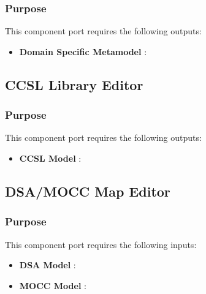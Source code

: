 \documentclass{gemoc} %
\begin{document}

\subsubsection{Purpose}


This component port requires the following outputs:
\begin{itemize}
  \item \textbf{Domain Specific Metamodel} :
\end{itemize}

\subsection{CCSL Library Editor}


\subsubsection{Purpose}


This component port requires the following outputs:
\begin{itemize}
  \item \textbf{CCSL Model} :
\end{itemize}

\subsection{DSA/MOCC Map Editor}


\subsubsection{Purpose}

This component port requires the following inputs:
\begin{itemize}
  \item \textbf{DSA Model} :
  \item \textbf{MOCC Model} :
\end{itemize}
\end{document}

